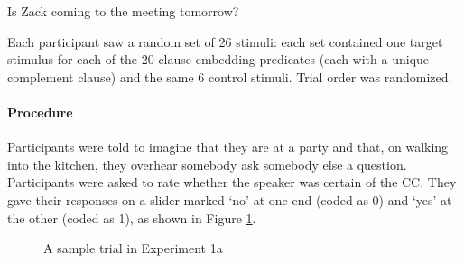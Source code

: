 \documentclass[11pt,fleqn]{article}
\newcommand{\6}{\mbox{$[\hspace*{-.6mm}[$}}
\newcommand{\9}{\mbox{$]\hspace*{-.6mm}]$}}
\begin{document}
\begin{exe}
\ex\label{control} Is Zack coming to the meeting tomorrow?
\end{exe}


Each participant saw a random set of 26 stimuli: each set contained one target stimulus for each of the 20 clause-embedding predicates (each with a unique complement clause) and the same 6 control stimuli. Trial order was randomized.

\paragraph{Procedure} Participants were told to imagine that they are at a party and that, on walking into the kitchen, they overhear somebody ask somebody else a question. Participants were asked to rate whether the speaker was certain of the CC. They gave their responses on a slider marked `no' at one end (coded as 0) and `yes' at the other (coded as 1), as shown in Figure \ref{fig-trial-exp1}.

\begin{figure}[h!]
\begin{center}
\end{center}
\caption{A sample trial in Experiment 1a}\label{fig-trial-exp1}
\end{figure}
\end{document}
